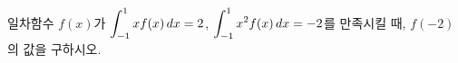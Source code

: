 일차함수 $f(x)$가 $\displaystyle\int_{-1}^{1}xf(x)\mkern3mu dx=2$, $\displaystyle\int_{-1}^{1}x^2f(x)\mkern3mu dx=-2$를 만족시킬 때, $f(-2)$의 값을 구하시오.
